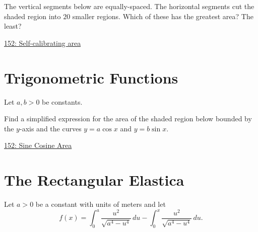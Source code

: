 \documentclass{ximera}
\begin{document}
\begin{question} \label{QPlerredd}

The vertical segments below are equally-spaced. The horizontal segments cut the shaded region into $20$ smaller regions. Which of these has the greatest area? The least?

\begin{onlineOnly}
    \begin{center}
\end{center}
\end{onlineOnly}

\href{https://www.desmos.com/calculator/wsgteg55ta}{152: Self-calibrating area}
\end{question}


\section{Trigonometric Functions}

\begin{question} \label{QLkfeREdfd}
Let $a,b>0$ be constants.

Find a simplified expression for the area of the shaded region below bounded by the $y$-axis and the curves $y=a\cos x$ and $y=b\sin x$.

\begin{onlineOnly}
    \begin{center}
\end{center}
\end{onlineOnly}

\href{https://www.desmos.com/calculator/ps1m0hksl0}{152: Sine Cosine Area}
\end{question}


\section{The Rectangular Elastica}

Let $a>0$ be a constant with units of meters and let
\[
   f(x) = \int_0^a \frac{u^2}{\sqrt{a^4-u^4}} \, du - \int_0^x \frac{u^2}{\sqrt{a^4-u^4}} \, du .
\]
\end{document}
